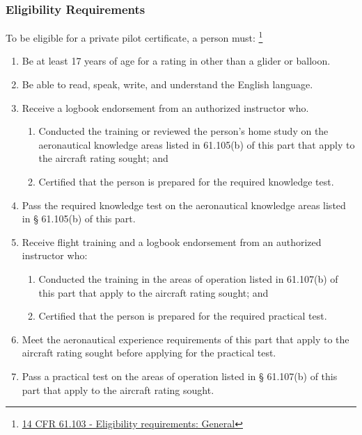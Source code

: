 \documentclass[12pt]{article}
\begin{document}
		\subsubsection{Eligibility Requirements}
			To be eligible for a private pilot certificate, a person must:
			\footnote{\href{https://www.law.cornell.edu/cfr/text/14/61.103}{14 CFR 61.103 - Eligibility requirements: General}}
				\begin{enumerate}[label=\alph*]
					\item Be at least 17 years of age for a rating in other than a glider or balloon.
					\item Be able to read, speak, write, and understand the English language. 
					\item Receive a logbook endorsement from an authorized instructor who.
						\begin{enumerate}[label=\arabic*]
							\item Conducted the training or reviewed the person's home study on the aeronautical knowledge areas listed in 61.105(b) of this part that apply to the aircraft rating sought; and
							\item Certified that the person is prepared for the required knowledge test.
						\end{enumerate}
					\item Pass the required knowledge test on the aeronautical knowledge areas listed in § 61.105(b) of this part.
					\item Receive flight training and a logbook endorsement from an authorized instructor who:
						\begin{enumerate}[label=\arabic*]
							\item Conducted the training in the areas of operation listed in 61.107(b) of this part that apply to the aircraft rating sought; and
							\item Certified that the person is prepared for the required practical test.
						\end{enumerate}
					\item Meet the aeronautical experience requirements of this part that apply to the aircraft rating sought before applying for the practical test.
					\item Pass a practical test on the areas of operation listed in § 61.107(b) of this part that apply to the aircraft rating sought.
				\end{enumerate}
\end{document}
